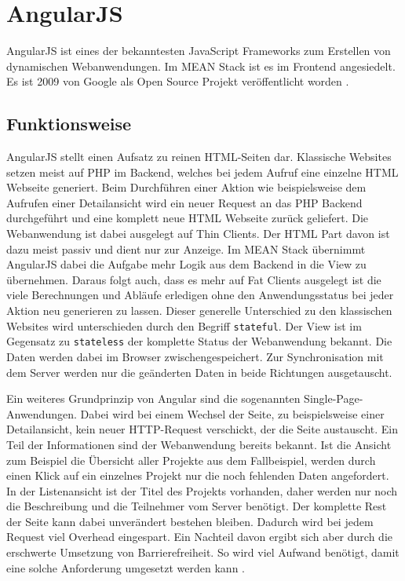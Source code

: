 \chapter{AngularJS}
\label{angularjs}

AngularJS ist eines der bekanntesten JavaScript Frameworks zum Erstellen von dynamischen Webanwendungen. Im MEAN Stack ist es im Frontend angesiedelt. Es ist 2009 von Google als Open Source Projekt veröffentlicht worden \cite{green2013angularjs}.

\section{Funktionsweise}
AngularJS stellt einen Aufsatz zu reinen HTML-Seiten dar. 
Klassische Websites setzen meist auf PHP im Backend, welches bei jedem Aufruf eine einzelne HTML Webseite generiert.
Beim Durchführen einer Aktion wie beispielsweise dem Aufrufen einer Detailansicht wird ein neuer Request an das PHP Backend durchgeführt und eine komplett neue HTML Webseite zurück geliefert.
Die Webanwendung ist dabei ausgelegt auf Thin Clients.
Der HTML Part davon ist dazu meist passiv und dient nur zur Anzeige.
Im MEAN Stack übernimmt AngularJS dabei die Aufgabe mehr Logik aus dem Backend in die View zu übernehmen.
Daraus folgt auch, dass es mehr auf Fat Clients ausgelegt ist die viele Berechnungen und Abläufe erledigen ohne den Anwendungsstatus bei jeder Aktion neu generieren zu lassen.
Dieser generelle Unterschied zu den klassischen Websites wird unterschieden durch den Begriff \texttt{stateful}.
Der View ist im Gegensatz zu \texttt{stateless} der komplette Status der Webanwendung bekannt.
Die Daten werden dabei im Browser zwischengespeichert.
Zur Synchronisation mit dem Server werden nur die geänderten Daten in beide Richtungen ausgetauscht.

Ein weiteres Grundprinzip von Angular sind die sogenannten Single-Page-Anwendungen.
Dabei wird bei einem Wechsel der Seite, zu beispielsweise einer Detailansicht, kein neuer HTTP-Request verschickt, der die Seite austauscht.
Ein Teil der Informationen sind der Webanwendung bereits bekannt.
Ist die Ansicht zum Beispiel die Übersicht aller Projekte aus dem Fallbeispiel, werden durch einen Klick auf ein einzelnes Projekt nur die noch fehlenden Daten angefordert.
In der Listenansicht ist der Titel des Projekts vorhanden, daher werden nur noch die Beschreibung und die Teilnehmer vom Server benötigt.
Der komplette Rest der Seite kann dabei unverändert bestehen bleiben.
Dadurch wird bei jedem Request viel Overhead eingespart.
Ein Nachteil davon ergibt sich aber durch die erschwerte Umsetzung von Barrierefreiheit.
So wird viel Aufwand benötigt, damit eine solche Anforderung umgesetzt werden kann \cite{thoughtworks:disabilities}.

